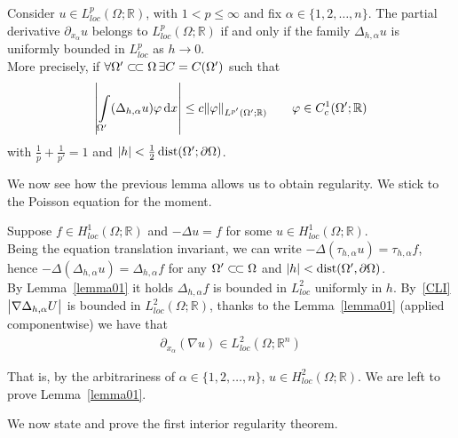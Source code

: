 \begin{lem}[]\label{lemma01}
	Consider \( u\in L_{loc}^{p}(\Omega ;\mathbb{R}) \), with \( 1< p \leq  \infty  \) and fix \( \alpha \in \{ 1,2,\ldots,n \} \). The partial derivative \( \partial_{x_{\alpha }}u \) belongs to \( L_{loc}^{p}(\Omega ;\mathbb{R}) \) if and only if the family \( \Delta _{h,\alpha }u \) is uniformly bounded in \( L_{loc}^{p} \) as \( h \to 0 \).\\
	More precisely, if \( \forall \Omega' \ssubset \Omega \, \exists C=C(\Omega') \) such that
	\begin{gather}
		\abs{\int\limits_{\Omega'}^{} (\Delta _{h,\alpha }u) \varphi  \dd{x}}\leq c\norm{\varphi }_{L^{p'}(\Omega';\mathbb{R})} \qquad \varphi \in C_{c}^{1}(\Omega';\mathbb{R})
	\end{gather}
	with \( \frac{1}{p}+\frac{1}{p'}=1 \) and \( \abs{h}< \frac{1}{2} \operatorname{dist}(\Omega';\partial \Omega )  \).
\end{lem}
We now see how the previous lemma allows us to obtain regularity. We stick to the Poisson equation for the moment. \par
Suppose \( f \in H_{loc}^{1}(\Omega ;\mathbb{R})  \) and \( -\Delta u=f \) for some \( u \in H_{loc}^{1}(\Omega ; \mathbb{R})  \).\\
Being the equation translation invariant, we can write \( -\Delta (\tau _{h,\alpha }u) = \tau _{h, \alpha }f \), hence \( -\Delta (\Delta _{h, \alpha }u) = \Delta _{h, \alpha }f \) for any \( \Omega' \ssubset \Omega  \) and \( \abs{h}< \operatorname{dist}(\Omega', \partial \Omega )  \). \\
By Lemma~\ref{lemma01} it holds \( \Delta _{h, \alpha }f \) is bounded in \( L_{loc}^{2} \) uniformly in \( h \). By~\eqref{CLI} \( \abs{\nabla \Delta _{h, \alpha }U} \) is bounded in \( L_{loc}^{2}(\Omega ;\mathbb{R})  \), thanks to the Lemma~\ref{lemma01} (applied componentwise) we have that
\begin{gather}
	\partial_{x_{\alpha }}(\nabla u) \in L_{loc}^{2}(\Omega ;\mathbb{R}^{n})
\end{gather}

That is, by the arbitrariness of \( \alpha \in \{ 1,2,\ldots,n \} \), \( u \in H_{loc}^{2}(\Omega ;\mathbb{R})  \). We are left to prove Lemma~\ref{lemma01}.\\
\par
We now state and prove the first interior regularity theorem.

